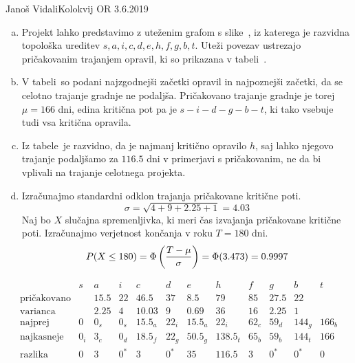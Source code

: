 \begin{naloga}{Janoš Vidali}{Kolokvij OR 3.6.2019}
\begin{odgovor}
\begin{enumerate}[(a)]
\item Projekt lahko predstavimo z uteženim grafom s slike~\fig,
iz katerega je razvidna topološka ureditev $s, a, i, c, d, e, h, f, g, b, t$.
Uteži povezav ustrezajo pričakovanim trajanjem opravil,
ki so prikazana v tabeli~.

\item V tabeli~
so podani najzgodnejši začetki opravil in najpoznejši začetki,
da se celotno trajanje gradnje ne podaljša.
Pričakovano trajanje gradnje je torej $\mu = 166$ dni,
edina kritična pot pa je $s - i - d - g - b - t$,
ki tako vsebuje tudi vsa kritična opravila.

\item Iz tabele~ je razvidno,
da je najmanj kritično opravilo $h$,
saj lahko njegovo trajanje
podaljšamo za $116.5$ dni v primerjavi s pričakovanim,
ne da bi vplivali na trajanje celotnega projekta.

\item Izračunajmo standardni odklon trajanja pričakovane kritične poti.
$$
\sigma = \sqrt{4 + 9 + 2.25 + 1} = 4.03
$$
Naj bo $X$ slučajna spremenljivka,
ki meri čas izvajanja pričakovane kritične poti.
Izračunajmo verjetnost končanja v roku $T = 180$ dni.
$$
P(X \le 180) = \Phi\left({T - \mu \over \sigma}\right) = \Phi(3.473) = 0.9997
$$
\end{enumerate}
%
\begin{slika}
\makebox[\textwidth][c]{
\pgfslika
}
\end{slika}
%
\begin{tabela}
$$
\begin{array}{c|ccccccccccc}
& s & a & i & c & d & e & h & f & g & b & t \\ \hline
\text{pričakovano} && 15.5 & 22 & 46.5 & 37 & 8.5 & 79 & 85 & 27.5 & 22 \\
\text{varianca} && 2.25 & 4 & 10.03 & 9 & 0.69 & 36 & 16 & 2.25 & 1 \\
\hline
\text{najprej} & 0 & 0_s & 0_s & 15.5_a & 22_i & 15.5_a & 22_i & 62_c & 59_d & 144_g & 166_b \\
\text{najkasneje} & 0_i & 3_c & 0_d & 18.5_f & 22_g & 50.5_g & 138.5_t & 65_b & 59_b & 144_t & 166 \\
\text{razlika} & 0 & 3 & 0^* & 3 & 0^* & 35 & 116.5 & 3 & 0^* & 0^* & 0
\end{array}
$$
\end{tabela}
\end{odgovor}
\end{naloga}

